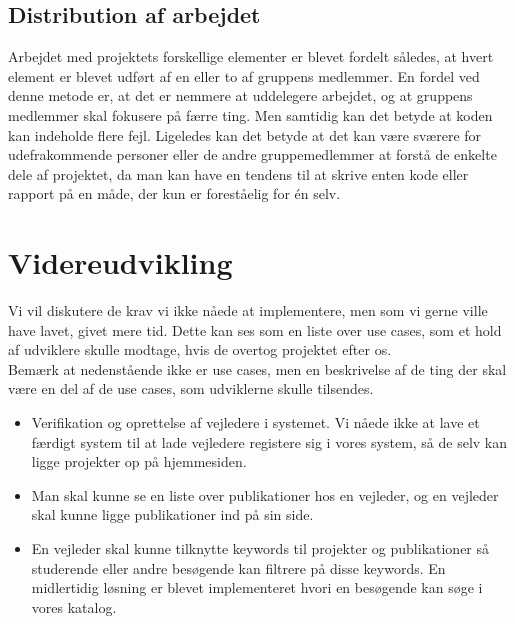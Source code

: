 \documentclass[12pt]{article}
\begin{document}
\subsection{Distribution af arbejdet}
Arbejdet med projektets forskellige elementer er blevet fordelt således, at hvert element er blevet udført af en eller to af gruppens medlemmer. En fordel ved denne metode er, at det er nemmere at uddelegere arbejdet, og at gruppens medlemmer skal fokusere på færre ting. Men samtidig kan det betyde at koden kan indeholde flere fejl. Ligeledes kan det betyde at det kan være sværere for udefrakommende personer eller de andre gruppemedlemmer at forstå de enkelte dele af projektet, da man kan have en tendens til at skrive enten kode eller rapport på en måde, der kun er foreståelig for én selv.

\section{Videreudvikling}
\label{sec:videreudvikling}
Vi vil diskutere de krav vi ikke nåede at implementere, men som vi gerne ville have lavet, givet mere tid. Dette kan ses som en liste over use cases, som et hold af udviklere skulle modtage, hvis de overtog projektet efter os.\\
Bemærk at nedenstående ikke er use cases, men en beskrivelse af de ting der skal være en del af de use cases, som udviklerne skulle tilsendes.\\
\begin{itemize}
\item Verifikation og oprettelse af vejledere i systemet. Vi nåede ikke at lave et færdigt system til at lade vejledere registere sig i vores system, så de selv kan ligge projekter op på hjemmesiden.
\item Man skal kunne se en liste over publikationer hos en vejleder, og en vejleder skal kunne ligge publikationer ind på sin side.
\item En vejleder skal kunne tilknytte keywords til projekter og publikationer så studerende eller andre besøgende kan filtrere på disse keywords. En midlertidig løsning er blevet implementeret hvori en besøgende kan søge i vores katalog.
\end{itemize}

\newpage
\end{document}
